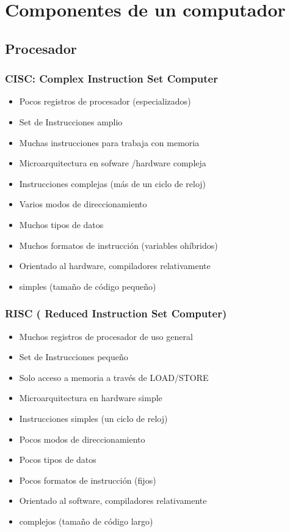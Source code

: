 \section{Componentes de un computador}

\subsection{Procesador }

\subsubsection{CISC: Complex Instruction Set Computer}
\begin{itemize}
\item Pocos registros de procesador (especializados)
\item Set de Instrucciones amplio
\item Muchas instrucciones para trabaja con memoria
\item Microarquitectura en sofware /hardware compleja
\item Instrucciones complejas (más de un ciclo de reloj)
\item Varios modos de direccionamiento
\item Muchos tipos de datos
\item Muchos formatos de instrucción (variables ohíbridos)
\item Orientado al hardware, compiladores relativamente
\item simples (tamaño de código pequeño)
\end{itemize}

\subsubsection{RISC ( Reduced Instruction Set Computer)}
\begin{itemize}
\item Muchos registros de procesador de uso general
\item Set de Instrucciones pequeño
\item Solo acceso a memoria a través de LOAD/STORE
\item Microarquitectura en hardware simple
\item Instrucciones simples (un ciclo de reloj)
\item Pocos modos de direccionamiento
\item Pocos tipos de datos
\item Pocos formatos de instrucción (fijos)
\item Orientado al software, compiladores relativamente
\item complejos (tamaño de código largo)
\end{itemize}

